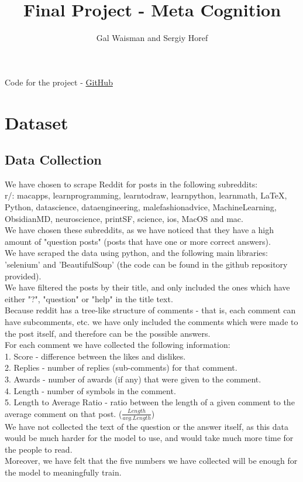\documentclass[11pt, oneside]{article}   	%
\title{Final Project - Meta Cognition}
\author{Gal Waisman and Sergiy Horef}
\begin{document}
\maketitle
\begin{center}
	Code for the project - \href{https://github.com/Horef/mc_final}{GitHub}
\end{center}

\tableofcontents

\newpage
\section{Dataset}
\subsection{Data Collection}
We have chosen to scrape Reddit for posts in the following subreddits:\\
r/: macapps, learnprogramming, learntodraw, learnpython, learnmath, LaTeX, Python, datascience, dataengineering, malefashionadvice, MachineLearning, ObsidianMD, neuroscience, printSF, science, ios, MacOS and mac.\\
We have chosen these subreddits, as we have noticed that they have a high amount of "question posts" (posts that have one or more correct answers).\\

We have scraped the data using python, and the following main libraries: 'selenium' and 'BeautifulSoup' (the code can be found in the github repository provided).\\
We have filtered the posts by their title, and only included the ones which have either "?", "question" or "help" in the title text.\\
Because reddit has a tree-like structure of comments - that is, each comment can have subcomments, etc. we have only included the comments which were made to the post itself, and therefore can be the possible answers.\\

For each comment we have collected the following information:\\
1. Score - difference between the likes and dislikes.\\
2. Replies - number of replies (sub-comments) for that comment.\\
3. Awards - number of awards (if any) that were given to the comment.\\
4. Length - number of symbols in the comment.\\
5. Length to Average Ratio - ratio between the length of a given comment to the average comment on that post. ($\frac{Length}{avg.Length}$)\\
We have not collected the text of the question or the answer itself, as this data would be much harder for the model to use, and would take much more time for the people to read.\\
Moreover, we have felt that the five numbers we have collected will be enough for the model to meaningfully train.\\
\end{document}
